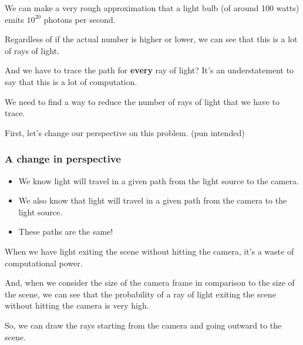 \documentclass[12pt]{beamer}
\begin{document}
  \begin{frame}

    We can make a very rough approximation that a light bulb (of around 100 watts) emits $10^{20}$ photons per second.

    Regardless of if the actual number is higher or lower, we can see that this is a lot of rays of light.

    And we have to trace the path for \textbf{every} ray of light?
    It's an understatement to say that this is a lot of computation.

    We need to find a way to reduce the number of rays of light that we have to trace.

    First, let's change our perspective on this problem. (pun intended)

  \end{frame}

  \begin{frame}
    \frametitle{A change in perspective}

    \begin{itemize}
      \item We know light will travel in a given path from the light source to the camera.
      \item We also know that light will travel in a given path from the camera to the light source.
      \item These paths are the same!
    \end{itemize}

    When we have light exiting the scene without hitting the camera, it's a waste of computational power.

    And, when we consider the size of the camera frame in comparison to the size of the scene, we can see that the probability of a ray of light exiting the scene without hitting the camera is very high.

    So, we can draw the rays starting from the camera and going outward to the scene.

  \end{frame}
\end{document}
